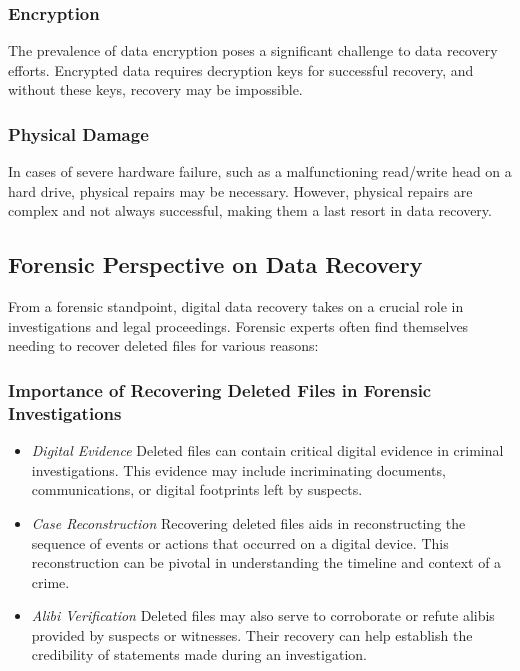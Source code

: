 \documentclass[11pt]{article}
\begin{document}
\subsubsection{Encryption}
The prevalence of data encryption poses a significant challenge to data recovery efforts. Encrypted data requires decryption keys for successful recovery, and without these keys, recovery may be impossible.

\subsubsection{Physical Damage}
In cases of severe hardware failure, such as a malfunctioning read/write head on a hard drive, physical repairs may be necessary. However, physical repairs are complex and not always successful, making them a last resort in data recovery.

\subsection{Forensic Perspective on Data Recovery}
From a forensic standpoint, digital data recovery takes on a crucial role in investigations and legal proceedings. Forensic experts often find themselves needing to recover deleted files for various reasons:

\subsubsection{Importance of Recovering Deleted Files in Forensic Investigations}
\begin{itemize}
  \item \textit{Digital Evidence} Deleted files can contain critical digital evidence in criminal investigations. This evidence may include incriminating documents, communications, or digital footprints left by suspects.
  \item \textit{Case Reconstruction} Recovering deleted files aids in reconstructing the sequence of events or actions that occurred on a digital device. This reconstruction can be pivotal in understanding the timeline and context of a crime.
  \item \textit{Alibi Verification} Deleted files may also serve to corroborate or refute alibis provided by suspects or witnesses. Their recovery can help establish the credibility of statements made during an investigation.
\end{itemize}
\end{document}
